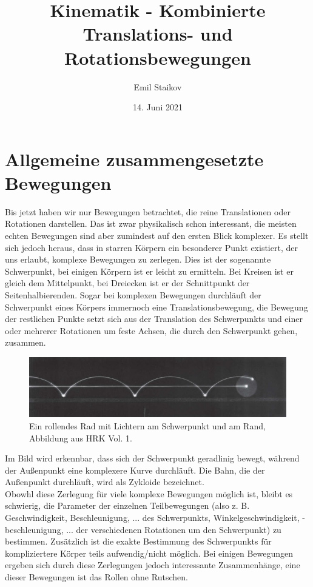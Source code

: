 \documentclass[11pt]{article}
\title{Kinematik - Kombinierte Translations- und Rotationsbewegungen}
\author{Emil Staikov}
\date{14. Juni 2021}
\begin{document}
\maketitle
\section{Allgemeine zusammengesetzte Bewegungen}
Bis jetzt haben wir nur Bewegungen betrachtet, die reine Translationen oder Rotationen darstellen. Das ist zwar physikalisch schon interessant, die meisten echten Bewegungen sind aber zumindest auf den ersten Blick komplexer. Es stellt sich jedoch heraus, dass in starren Körpern ein besonderer Punkt existiert, der uns erlaubt, komplexe Bewegungen zu zerlegen. Dies ist der sogenannte Schwerpunkt, bei einigen Körpern ist er leicht zu ermitteln. Bei Kreisen ist er gleich dem Mittelpunkt, bei Dreiecken ist er der Schnittpunkt der Seitenhalbierenden. Sogar bei komplexen Bewegungen durchläuft der Schwerpunkt eines Körpers immernoch eine Translationsbewegung, die Bewegung der restlichen Punkte setzt sich aus der Translation des Schwerpunkts und einer oder mehrerer Rotationen um feste Achsen, die durch den Schwerpunkt gehen, zusammen. 
\begin{figure}[H]
        \centering
        \includegraphics[width=\textwidth]{abb/5-komb-rot-tra-rollen-ohne-rutschen/schwerpunkt-translation.png}
        \caption{Ein rollendes Rad mit Lichtern am Schwerpunkt und am Rand, Abbildung aus HRK Vol. 1.}
\end{figure}
Im Bild wird erkennbar, dass sich der Schwerpunkt geradlinig bewegt, während der Außenpunkt eine komplexere Kurve durchläuft. Die Bahn, die der Außenpunkt durchläuft, wird als Zykloide bezeichnet. \\
Obowhl diese Zerlegung für viele komplexe Bewegungen möglich ist, bleibt es schwierig, die Parameter der einzelnen Teilbewegungen (also z. B. Geschwindigkeit, Beschleunigung, ... des Schwerpunkts, Winkelgeschwindigkeit, -beschleunigung, ... der verschiedenen Rotationen um den Schwerpunkt) zu bestimmen. Zusätzlich ist die exakte Bestimmung des Schwerpunkts für kompliziertere Körper teils aufwendig/nicht möglich. Bei einigen Bewegungen ergeben sich durch diese Zerlegungen jedoch interessante Zusammenhänge, eine dieser Bewegungen ist das Rollen ohne Rutschen. 
\end{document}
